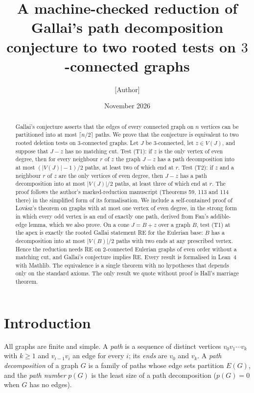 \documentclass[11pt]{amsart}
\title[A machine-checked reduction of Gallai's conjecture]{A machine-checked reduction of Gallai's
path decomposition conjecture to two rooted tests on $3$-connected graphs}
\author{[Author]}
\date{November 2026}
\theoremstyle{definition}
\theoremstyle{remark}
\renewcommand{\_}{\oldunderscore\allowbreak}
\begin{document}
\begin{abstract}
Gallai's conjecture asserts that the edges of every connected graph on $n$ vertices can be
partitioned into at most $\lceil n/2\rceil$ paths. We prove that the conjecture is equivalent to two
rooted deletion tests on $3$-connected graphs. Let $J$ be $3$-connected, let $z\in V(J)$, and
suppose that $J-z$ has no matching cut. Test (T1): if $z$ is the only vertex of even degree, then for
every neighbour $r$ of $z$ the graph $J-z$ has a path decomposition into at most $(|V(J)|-1)/2$
paths, at least two of which end at $r$. Test (T2): if $z$ and a neighbour $r$ of $z$ are the only
vertices of even degree, then $J-z$ has a path decomposition into at most $|V(J)|/2$ paths, at least
three of which end at $r$. The proof follows the author's marked-reduction manuscript (Theorems 59,
113 and 114 there) in the simplified form of its formalisation. We include a self-contained proof of
Lov\'asz's theorem on graphs with at most one vertex of even degree, in the strong form in which
every odd vertex is an end of exactly one path, derived from Fan's addible-edge lemma, which we also
prove. On a cone $J=B+z$ over a graph $B$, test (T1) at the apex is exactly the rooted Gallai
statement RE for the Eulerian base: $B$ has a decomposition into at most $|V(B)|/2$ paths with two
ends at any prescribed vertex. Hence the reduction needs RE on $2$-connected Eulerian graphs of
even order without a matching cut, and Gallai's conjecture implies RE. Every result is formalised in
Lean~4 with Mathlib. The equivalence is a single theorem with no hypotheses that depends only on the
standard axioms. The only result we quote without proof is Hall's marriage theorem.
\end{abstract}

\maketitle

\section{Introduction}\label{sec:intro}

All graphs are finite and simple. A \emph{path} is a sequence of distinct vertices $v_0v_1\cdots
v_k$ with $k\ge1$ and $v_{i-1}v_i$ an edge for every $i$; its \emph{ends} are $v_0$ and $v_k$. A
\emph{path decomposition} of a graph $G$ is a family of paths whose edge sets partition $E(G)$, and
the \emph{path number} $p(G)$ is the least size of a path decomposition ($p(G)=0$ when $G$ has no
edges).
\end{document}

